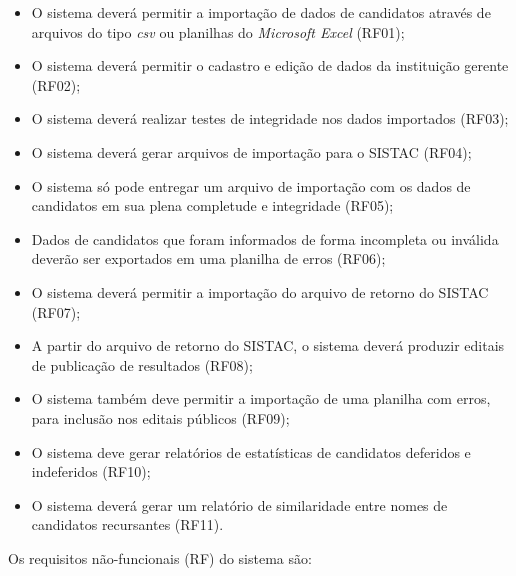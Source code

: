 \documentclass[
	12pt,			%
	openright,		%
	oneside,	
	a4paper,		%
	english,		%
	brazil			%
]{abntex2/abntex2}  %
\begin{document}
	\begin{itemize}

		\item O sistema deverá permitir a importação de dados de candidatos através de arquivos do tipo \textit{csv} ou planilhas do \textit{Microsoft Excel} (RF01);
		\item O sistema deverá permitir o cadastro e edição de dados da instituição gerente (RF02);
		\item O sistema deverá realizar testes de integridade nos dados importados (RF03);
		\item O sistema deverá gerar arquivos de importação para o SISTAC (RF04);
		\item O sistema só pode entregar um arquivo de importação com os dados de candidatos em sua plena completude e integridade (RF05);
		\item Dados de candidatos que foram informados de forma incompleta ou inválida deverão ser exportados em uma planilha de erros (RF06);
		\item O sistema deverá permitir a importação do arquivo de retorno do SISTAC (RF07);
		\item A partir do arquivo de retorno do SISTAC, o sistema deverá produzir editais de publicação de resultados (RF08);
		\item O sistema também deve permitir a importação de uma planilha com erros, para inclusão nos editais públicos (RF09);
		\item O sistema deve gerar relatórios de estatísticas de candidatos deferidos e indeferidos (RF10);
		\item O sistema deverá gerar um relatório de similaridade entre nomes de candidatos recursantes (RF11).
		
	\end{itemize}
	
	Os requisitos não-funcionais (RF) do sistema são:
	
\end{document}
